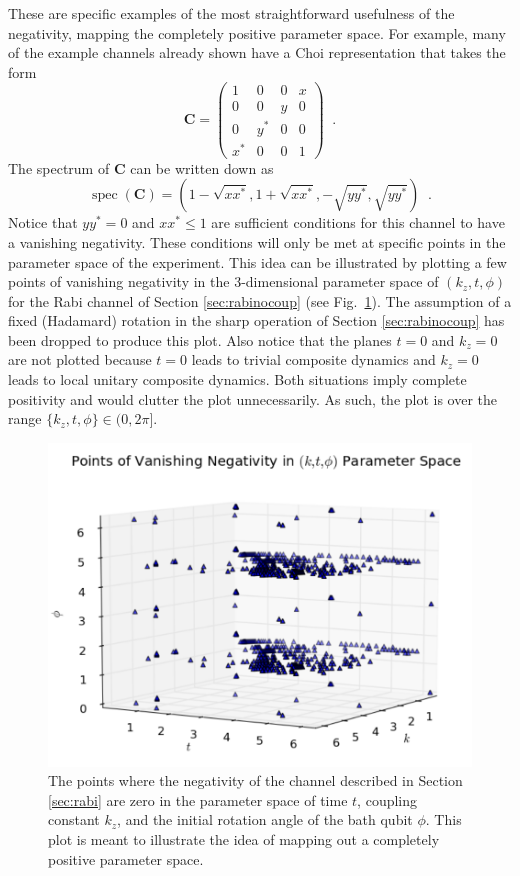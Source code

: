 These are specific examples of the most straightforward usefulness of the negativity, mapping the completely positive parameter space.  For example, many of the example channels already shown have a Choi representation that takes the form
$$
\mathbf{C} = \begin{pmatrix}
1&0&0&x\\
0&0&y&0\\
0&y^*&0&0\\
x^*&0&0&1
 \end{pmatrix}\;\;.
$$
The spectrum of $\mathbf{C}$ can be written down as 
$$
\operatorname{spec}\left(\mathbf{C}\right) = \left( 1-\sqrt{xx^*},1+\sqrt{xx^*},-\sqrt{yy^*},\sqrt{yy^*}\right)\;\;.
 $$
Notice that $yy^*=0$ and $xx^*\le 1$ are sufficient conditions for this channel to have a vanishing negativity.  These conditions will only be met at specific points in the parameter space of the experiment.  This idea can be illustrated by plotting a few points of vanishing negativity in the 3-dimensional parameter space of $(k_z,t,\phi)$ for the Rabi channel of Section \ref{sec:rabinocoup} (see Fig.\ \ref{fig:CPspace}).  The assumption of a fixed (Hadamard) rotation in the sharp operation of Section \ref{sec:rabinocoup} has been dropped to produce this plot.  Also notice that the planes $t=0$ and $k_z=0$ are not plotted because $t=0$ leads to trivial composite dynamics and $k_z=0$ leads to local unitary composite dynamics.  Both situations imply complete positivity and would clutter the plot unnecessarily.  As such, the plot is over the range $\{k_z,t,\phi\}\in(0,2\pi]$.
 
\begin{figure}[th]
\centering
\includegraphics[scale=0.70]{figure9.pdf}
\caption{The points where the negativity of the channel described in Section \ref{sec:rabi} are zero in the parameter space of time $t$, coupling constant $k_z$, and the initial rotation angle of the bath qubit $\phi$.  This plot is meant to illustrate the idea of mapping out a completely positive parameter space.}
 \label{fig:CPspace}
\end{figure} 

